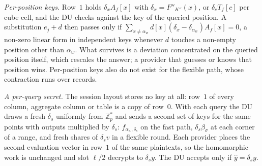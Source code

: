 \documentclass[11pt,a4paper]{article}
\begin{document}
\emph{Per-position keys.} Row~$1$ holds $\delta_xA_f[x]$ with
$\delta_x=F''_{K''}(x)$, or $\delta_cT_f[c]$ per cube cell, and the DU checks
against the key of the queried position. A substitution $e_j+d$ then passes
only if $\sum_{x\neq\alpha_w}d[x](\delta_x-\delta_{\alpha_w})A_f[x]=0$, a
non-zero linear form in independent keys whenever $d$ touches a non-empty
position other than $\alpha_w$. What survives is a deviation concentrated on
the queried position itself, which rescales the answer; a provider that guesses
or knows that position wins. Per-position keys also do not exist for the
flexible path, whose contraction runs over records.

\emph{A per-query secret.} The session layout stores no key at all: row~$1$ of
every column, aggregate column or table is a copy of row~$0$. With each query
the DU draws a fresh $\delta_s$ uniformly from $\mathbb{Z}_p^{*}$ and sends a
second set of keys for the same points with outputs multiplied by $\delta_s$:
$f_{\alpha_w,\delta_s}$ on the fast path, $\delta_s\beta_\sigma$ at each corner
of a range, and fresh shares of $\delta_s v$ in a flexible round. Each provider
places the second evaluation vector in row~$1$ of the same plaintexts, so the
homomorphic work is unchanged and slot $\ell/2$ decrypts to $\delta_s y$. The
DU accepts only if $\hat y=\delta_s y$.
\end{document}
